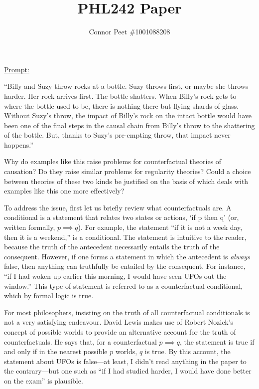 \documentclass{article}
\title{PHL242 Paper}
\author{Connor Peet \#1001088208}
\begin{document}
\maketitle

\underline{Prompt:}
\begin{displayquote}
``Billy and Suzy throw rocks at a bottle. Suzy throws first, or maybe she throws harder. Her rock arrives first. The bottle shatters. When Billy's rock gets to where the bottle used to be, there is nothing there but flying shards of glass. Without Suzy's throw, the impact of Billy's rock on the intact bottle would have been one of the final steps in the causal chain from Billy's throw to the shattering of the bottle. But, thanks to Suzy's pre-empting throw, that impact never happens.''

Why do examples like this raise problems for counterfactual theories of causation? Do they raise similar problems for regularity theories? Could a choice between theories of these two kinds be justified on the basis of which deals with examples like this one more effectively?
\end{displayquote}

To address the issue, first let us briefly review what counterfactuals are. A conditional is a statement that relates two states or actions, `if p then q' (or, written formally, $p \implies q$). For example, the statement ``if it is not a week day, then it is a weekend,'' is a conditional. The statement is intuitive to the reader, because the truth of the antecedent necessarily entails the truth of the consequent. However, if one forms a statement in which the antecedent is \textit{always} false, then anything can truthfully be entailed by the consequent. For instance, ``if I had woken up earlier this morning, I would have seen UFOs out the window.'' This type of statement is referred to as a counterfactual conditional, which by formal logic is true.

For most philosophers, insisting on the truth of all counterfactual conditionals is not a very satisfying endeavour. David Lewis makes use of Robert Nozick's concept of possible worlds to provide an alternative account for the truth of counterfactuals. He says that, for a counterfactual $p \implies q$, the statement is true if and only if in the nearest possible $p$ worlds, $q$ is true. By this account, the statement about UFOs is false---at least, I didn't read anything in the paper to the contrary---but one such as ``if I had studied harder, I would have done better on the exam'' is plausible.
\end{document}
